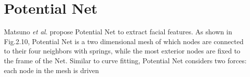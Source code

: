 \documentclass[12pt]{report}
\begin{document}
\section{Potential Net}
\par 
Matsuno \textit{et al}. \cite{61} \cite{41} propose Potential Net to extract facial features. As shown in Fig.2.10, Potential Net is a two dimensional mesh of which nodes are connected to their four neighbors with springs, while the most exterior nodes are fixed to the frame of the Net. Similar to curve fitting, Potential Net considers two forces: each node in the mesh is driven
\end{document}
